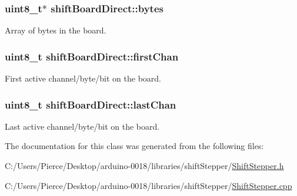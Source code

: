 \hypertarget{classshift_board_direct_ab71f1de9ff5b1324445099f001ce7231}{
\subsubsection[{bytes}]{\setlength{\rightskip}{0pt plus 5cm}uint8\_\-t$\ast$ {\bf shiftBoardDirect::bytes}}}
\label{classshift_board_direct_ab71f1de9ff5b1324445099f001ce7231}


Array of bytes in the board. 

\hypertarget{classshift_board_direct_a16ef946d7cef5a67b726eeba6f4b020a}{
\subsubsection[{firstChan}]{\setlength{\rightskip}{0pt plus 5cm}uint8\_\-t {\bf shiftBoardDirect::firstChan}}}
\label{classshift_board_direct_a16ef946d7cef5a67b726eeba6f4b020a}


First active channel/byte/bit on the board. 

\hypertarget{classshift_board_direct_a99e0f303fee22d079b677b253369c440}{
\subsubsection[{lastChan}]{\setlength{\rightskip}{0pt plus 5cm}uint8\_\-t {\bf shiftBoardDirect::lastChan}}}
\label{classshift_board_direct_a99e0f303fee22d079b677b253369c440}


Last active channel/byte/bit on the board. 



The documentation for this class was generated from the following files:\begin{DoxyCompactItemize}
\item 
C:/Users/Pierce/Desktop/arduino-\/0018/libraries/shiftStepper/\hyperlink{_shift_stepper_8h}{ShiftStepper.h}\item 
C:/Users/Pierce/Desktop/arduino-\/0018/libraries/shiftStepper/\hyperlink{_shift_stepper_8cpp}{ShiftStepper.cpp}\end{DoxyCompactItemize}
